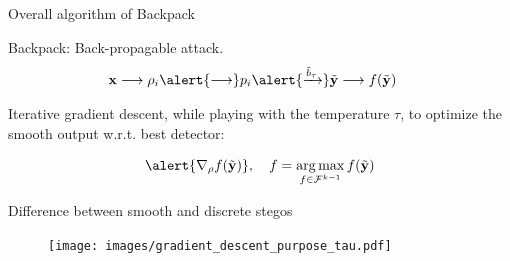 \documentclass[10pt]{beamer}
\DeclareMathOperator*{\argmax}{arg\,max}
\begin{document}
\begin{frame}{Overall algorithm of Backpack}


\alert{Backpack}: \alert{Back-p}ropagable att\alert{ack}.
   \begin{align*}
    \mathbf{x} \longrightarrow \rho_i \alert{\longrightarrow} p_i \alert{ \xrightarrow{\tilde{b}_\tau}} \tilde{\mathbf{y}} & \longrightarrow f(\tilde{\mathbf{y}}) %
    \end{align*}
\pause

Iterative gradient descent, while playing with the temperature $\tau$, to optimize the smooth output w.r.t. best detector:

\begin{equation}
    \alert{\nabla_{\rho} f(\tilde{\mathbf{y}})}, \quad  f = \argmax_{f \in \mathcal{F}^{k-1}} f(\tilde{\mathbf{y}})
\end{equation}

\end{frame}

\begin{frame}{Difference between smooth and discrete stegos}
    \begin{figure}[h]
        \texttt{[image: images/gradient\_descent\_purpose\_tau.pdf]}
    \end{figure}
\end{frame}


\end{document}
